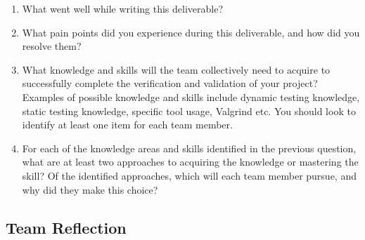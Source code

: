 \documentclass[12pt, titlepage]{article}
\begin{document}


\begin{enumerate}
  \item What went well while writing this deliverable? 
  \item What pain points did you experience during this deliverable, and how
    did you resolve them?
  \item What knowledge and skills will the team collectively need to acquire to
  successfully complete the verification and validation of your project?
  Examples of possible knowledge and skills include dynamic testing knowledge,
  static testing knowledge, specific tool usage, Valgrind etc.  You should look to
  identify at least one item for each team member.
  \item For each of the knowledge areas and skills identified in the previous
  question, what are at least two approaches to acquiring the knowledge or
  mastering the skill?  Of the identified approaches, which will each team
  member pursue, and why did they make this choice?
\end{enumerate}

\subsection*{Team Reflection}
\end{document}
